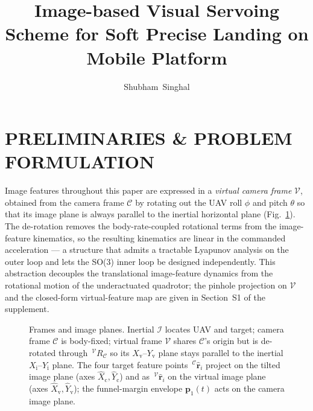 
% 

\title{Image-based Visual Servoing Scheme for Soft Precise Landing on Mobile Platform}

\author{Shubham~Singhal}


\maketitle

\section{PRELIMINARIES \& PROBLEM FORMULATION} \label{background: section}
Image features throughout this paper are expressed in a \emph{virtual camera frame} $\mathcal{V}$, obtained from the camera frame $\mathcal{C}$ by rotating out the UAV roll $\phi$ and pitch $\theta$ so that its image plane is always parallel to the inertial horizontal plane (Fig.~\ref{frames planes: figure}). The de-rotation removes the body-rate-coupled rotational terms from the image-feature kinematics, so the resulting kinematics are linear in the commanded acceleration --- a structure that admits a tractable Lyapunov analysis on the outer loop and lets the SO(3) inner loop be designed independently. This abstraction \cite{fink2017, xie2016_2} decouples the translational image-feature dynamics from the rotational motion of the underactuated quadrotor; the pinhole projection on $\mathcal{V}$ and the closed-form virtual-feature map are given in Section~S1 of the supplement.

\begin{figure}[!t]
\centering
    \resizebox{\columnwidth}{!}{}
    \caption{Frames and image planes. Inertial $\mathcal{I}$ locates UAV and target; camera frame $\mathcal{C}$ is body-fixed; virtual frame $\mathcal{V}$ shares $\mathcal{C}$'s origin but is de-rotated through $\,^\mathcal{V}R_\mathcal{C}$ so its $X_\text{v}$--$Y_\text{v}$ plane stays parallel to the inertial $X_\text{i}$--$Y_\text{i}$ plane. The four target feature points $\,^\mathcal{C}\boldsymbol{\hat{r}}_i$ project on the tilted image plane (axes $\hat{X}_\text{c},\hat{Y}_\text{c}$) and as $\,^\mathcal{V}\boldsymbol{\hat{r}}_i$ on the virtual image plane (axes $\hat{X}_\text{v},\hat{Y}_\text{v}$); the funnel-margin envelope $\boldsymbol{p}_1(t)$ acts on the camera image plane.}
    \label{frames planes: figure}
\end{figure}

